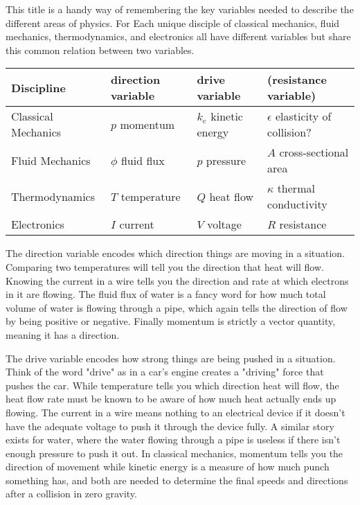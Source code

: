 \documentclass[a4paper]{article}
\begin{document}
This title is a handy way of remembering the key variables needed to describe the different areas of physics. For Each unique disciple of classical mechanics, fluid mechanics, thermodynamics, and electronics all have different variables but share this common relation between two variables. 

\vspace{0.2cm} \hspace{0.2cm}
\begin{tabular}{| l | l | l | l |}
\toprule
Discipline & direction variable & drive variable & (resistance variable) \\
\midrule
Classical Mechanics & $p$ momentum & $k_e$ kinetic energy & $\epsilon$ elasticity of collision? \\
Fluid Mechanics & $\phi$ fluid flux & $p$ pressure & $A$ cross-sectional area\\
Thermodynamics & $T$ temperature & $Q$ heat flow & $\kappa$ thermal conductivity \\
Electronics & $I$ current & $V$ voltage & $R$ resistance \\
\bottomrule
\end{tabular}
\vspace{0.2cm}

The direction variable encodes which direction things are moving in a situation. Comparing two temperatures will tell you the direction that heat will flow. Knowing the current in a wire tells you the direction and rate at which electrons in it are flowing. The fluid flux of water is a fancy word for how much total volume of water is flowing through a pipe, which again tells the direction of flow by being positive or negative. Finally momentum is strictly a vector quantity, meaning it has a direction.

The drive variable encodes how strong things are being pushed in a situation. Think of the word "drive" as in a car's engine creates a "driving" force that pushes the car. While temperature tells you which direction heat will flow, the heat flow rate must be known to be aware of how much heat actually ends up flowing. The current in a wire means nothing to an electrical device if it doesn't have the adequate voltage to push it through the device fully. A similar story exists for water, where the water flowing through a pipe is useless if there isn't enough pressure to push it out. In classical mechanics, momentum tells you the direction of movement while kinetic energy is a measure of how much punch something has, and both are needed to determine the final speeds and directions after a collision in zero gravity. 
\end{document}
